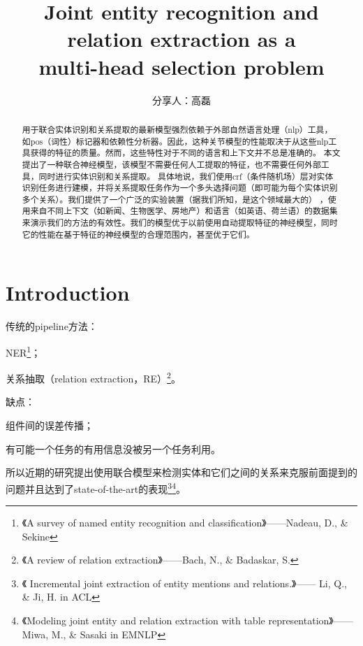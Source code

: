 \documentclass[a4paper,UTF8,no-math,zihao=-4]{ctexart}
\title{Joint entity recognition and relation extraction as a \\ multi-head selection problem}
\author{ 分享人：高磊 }
\date{\zhtoday}
\begin{document}
	\maketitle



	
	\begin{abstract}
		用于联合实体识别和关系提取的最新模型强烈依赖于外部自然语言处理（nlp）工具，如pos（词性）标记器和依赖性分析器。因此，这种关节模型的性能取决于从这些nlp工具获得的特征的质量。然而，这些特性对于不同的语言和上下文并不总是准确的。
		本文提出了一种联合神经模型，该模型不需要任何人工提取的特征，也不需要任何外部工具，同时进行实体识别和关系提取。
		具体地说，我们使用crf（条件随机场）层对实体识别任务进行建模，并将关系提取任务作为一个多头选择问题（即可能为每个实体识别多个关系）。我们提供了一个广泛的实验装置（据我们所知，是这个领域最大的）
		，使用来自不同上下文（如新闻、生物医学、房地产）和语言（如英语、荷兰语）的数据集来演示我们的方法的有效性。我们的模型优于以前使用自动提取特征的神经模型，同时它的性能在基于特征的神经模型的合理范围内，甚至优于它们。
	\end{abstract}

	\section{Introduction}
	
	传统的pipeline方法：\begin{enumerate*}[label=(\roman*)]
		\item NER\footnote{《A survey of named entity recognition and classification》——Nadeau, D., \& Sekine}；
		\item 关系抽取（relation extraction，RE）\footnote{《A review of relation extraction》——Bach, N., \& Badaskar, S.}。
	\end{enumerate*}
	缺点：
	\begin{enumerate*}[label=(\roman*)]
		\item 组件间的误差传播；
		\item 有可能一个任务的有用信息没被另一个任务利用。
	\end{enumerate*}所以近期的研究提出使用联合模型来检测实体和它们之间的关系来克服前面提到的问题并且达到了state-of-the-art的表现\footnote{ 《 Incremental joint extraction of entity mentions and relations.》—— Li, Q., \& Ji, H. in ACL}\footnote{《Modeling joint entity and relation extraction with
	table representation》—— Miwa, M., \& Sasaki in EMNLP}。
	
\end{document}
